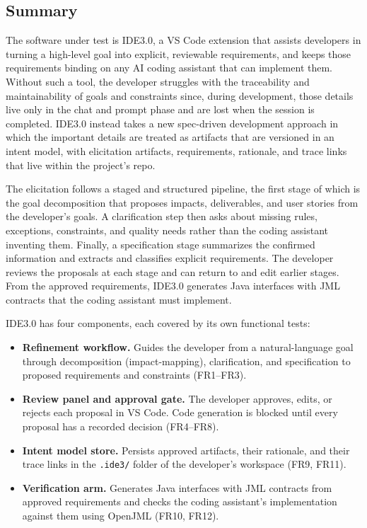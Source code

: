 \documentclass[12pt, titlepage]{article}
\begin{document}
\subsection{Summary}


The software under test is IDE3.0, a VS Code extension that assists developers
in turning a high-level goal into explicit, reviewable requirements, and keeps
those requirements binding on any AI coding assistant that can implement them.
Without such a tool, the developer struggles with the traceability and
maintainability of goals and constraints since, during development, those
details live only in the chat and prompt phase and are lost when the session
is completed. IDE3.0 instead takes a new spec-driven development approach in
which the important details are treated as artifacts that are versioned in an
intent model, with elicitation artifacts, requirements, rationale, and trace
links that live within the project's repo.

The elicitation follows a staged and structured pipeline, the first stage of
which is the goal decomposition that proposes impacts, deliverables,
and user stories from the developer's goals. A clarification step then asks
about missing rules, exceptions, constraints, and quality needs rather than
the coding assistant inventing them. Finally, a specification stage summarizes
the confirmed information and extracts and classifies explicit requirements.
The developer reviews the proposals at each stage and can return to and edit
earlier stages. From the approved requirements, IDE3.0 generates Java
interfaces with JML contracts that the coding assistant must implement.

IDE3.0 has four components, each covered by its own functional tests:
\begin{itemize}
  \item \textbf{Refinement workflow.} Guides the developer from a
  natural-language goal through decomposition (impact-mapping), clarification, and
  specification to proposed requirements and constraints (FR1--FR3).
  \item \textbf{Review panel and approval gate.} The developer approves,
  edits, or rejects each proposal in VS Code. Code generation is blocked
  until every proposal has a recorded decision (FR4--FR8).
  \item \textbf{Intent model store.} Persists approved artifacts, their
  rationale, and their trace links in the \texttt{.ide3/} folder of the
  developer's workspace (FR9, FR11).
  \item \textbf{Verification arm.} Generates Java interfaces with JML
  contracts from approved requirements and checks the coding assistant's
  implementation against them using OpenJML (FR10, FR12).

\end{itemize}
\end{document}
